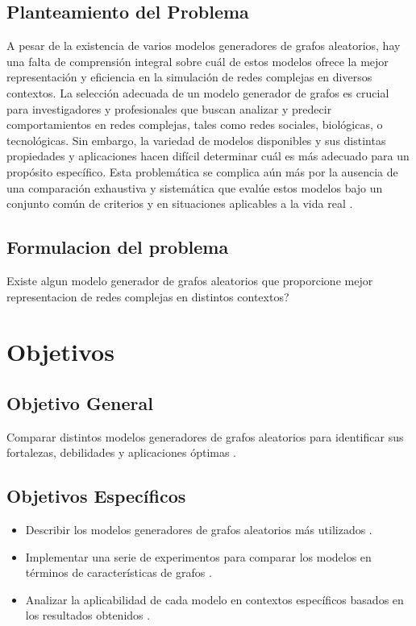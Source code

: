 \subsection{Planteamiento del Problema}
A pesar de la existencia de varios modelos generadores de grafos aleatorios, hay una falta de comprensión integral sobre cuál de estos modelos ofrece la mejor representación y eficiencia en la simulación de redes complejas en diversos contextos. La selección adecuada de un modelo generador de grafos es crucial para investigadores y profesionales que buscan analizar y predecir comportamientos en redes complejas, tales como redes sociales, biológicas, o tecnológicas. Sin embargo, la variedad de modelos disponibles y sus distintas propiedades y aplicaciones hacen difícil determinar cuál es más adecuado para un propósito específico. Esta problemática se complica aún más por la ausencia de una comparación exhaustiva y sistemática que evalúe estos modelos bajo un conjunto común de criterios y en situaciones aplicables a la vida real \citep{Wilson2008, Bollobas2001, Caldarelli2007} .

\subsection{Formulacion del problema}
\textquestiondown Existe algun modelo generador de grafos aleatorios que proporcione mejor representacion de redes complejas en distintos contextos?


\section{Objetivos}
\subsection{Objetivo General}
Comparar distintos modelos generadores de grafos aleatorios para identificar sus fortalezas, debilidades y aplicaciones óptimas .
\subsection{Objetivos Específicos}
\begin{itemize}
    \item Describir los modelos generadores de grafos aleatorios más utilizados .
    \item Implementar una serie de experimentos para comparar los modelos en términos de características de grafos .
    \item Analizar la aplicabilidad de cada modelo en contextos específicos basados en los resultados obtenidos .
\end{itemize}

